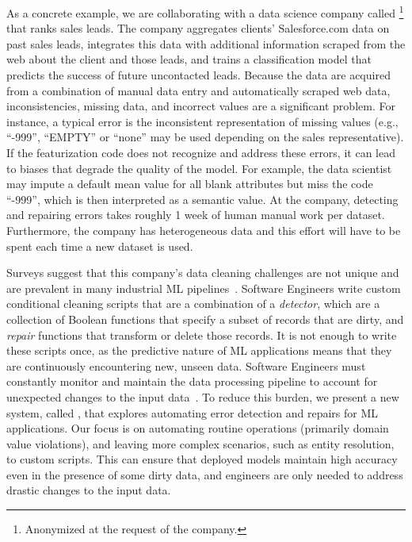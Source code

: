 As a concrete example, we are collaborating with a data science company called \company\footnote{Anonymized at the request of the company.} that ranks sales leads. The company aggregates clients' Salesforce.com data on past sales leads, integrates this data with additional information scraped from the web about the client and those leads, and trains a classification model that predicts the success of future uncontacted leads.  Because the data are acquired from a combination of manual data entry and automatically scraped web data, inconsistencies, missing data, and incorrect values are a significant problem.  For instance, a typical error is the inconsistent representation of missing values (e.g., ``-999'', ``EMPTY'' or ``none'' may be used depending on the sales representative).  If the featurization code does not recognize and address these errors, it can lead to biases that degrade the quality of the model. For example, the data scientist may impute a default mean value for all blank attributes but miss the code ``-999'', which is then interpreted as a semantic value. 
At the company, detecting and repairing errors takes roughly 1 week of human manual work per dataset. 
Furthermore, the company has heterogeneous data and this effort will have to be spent each time a new dataset is used.

Surveys suggest that this company's data cleaning challenges are not unique and are prevalent in many industrial ML pipelines~\cite{krishnan2016hilda}.  
Software Engineers write custom conditional cleaning scripts that are a combination of a {\it detector}, which are a collection of Boolean functions that specify a subset of records that are dirty, and {\it repair} functions that transform or delete those records.  It is not enough to write these scripts once, as the predictive nature of ML applications means that they are continuously encountering new, unseen data.
Software Engineers must constantly monitor and maintain the data processing pipeline to account for unexpected changes to the input data~\cite{sculley2014machine, DBLP:conf/sigmod/KrishnanFGWW16}.
To reduce this burden, we present a new system, called \sys, that explores automating error detection and repairs for ML applications.   
Our focus is on automating routine operations (primarily domain value violations), and leaving more complex scenarios, such as entity resolution, to custom scripts.
This can ensure that deployed models maintain high accuracy even in the presence of some dirty data, and engineers are only needed to address drastic changes to the input data. 

